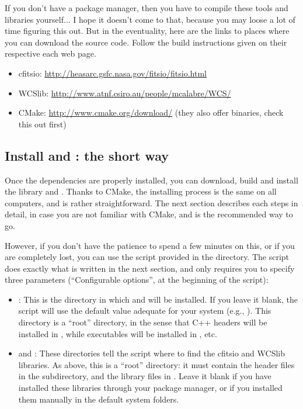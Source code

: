 If you don't have a package manager, then you have to compile these tools and libraries yourself... I hope it doesn't come to that, because you may loose a lot of time figuring this out. But in the eventuality, here are the links to places where you can download the source code. Follow the build instructions given on their respective each web page.
\begin{itemize}
\item cfitsio: \url{http://heasarc.gsfc.nasa.gov/fitsio/fitsio.html}
\item WCSlib: \url{http://www.atnf.csiro.au/people/mcalabre/WCS/}
\item CMake: \url{http://www.cmake.org/download/} (they also offer binaries, check this out first)
\end{itemize}

\subsection{Install \phypp and \egg: the short way}

Once the dependencies are properly installed, you can download, build and install the \phypp library and \egg. Thanks to CMake, the installing process is the same on all computers, and is rather straightforward. The next section describes each steps in detail, in case you are not familiar with CMake, and is the recommended way to go.

However, if you don't have the patience to spend a few minutes on this, or if you are completely lost, you can use the  script provided in the  directory. The script does exactly what is written in the next section, and only requires you to specify three parameters (``Configurable options'', at the beginning of the script):
\begin{itemize}
\item {}: This is the directory in which \phypp and \egg will be installed. If you leave it blank, the script will use the default value adequate for your system (e.g., ). This directory is a ``root'' directory, in the sense that C++ headers will be installed in , while executables will be installed in , etc.
\item {} and : These directories tell the script where to find the cfitsio and WCSlib libraries. As above, this is a ``root'' directory: it must contain the header files in the  subdirectory, and the library files in . Leave it blank if you have installed these libraries through your package manager, or if you installed them manually in the default system folders.
\end{itemize}

